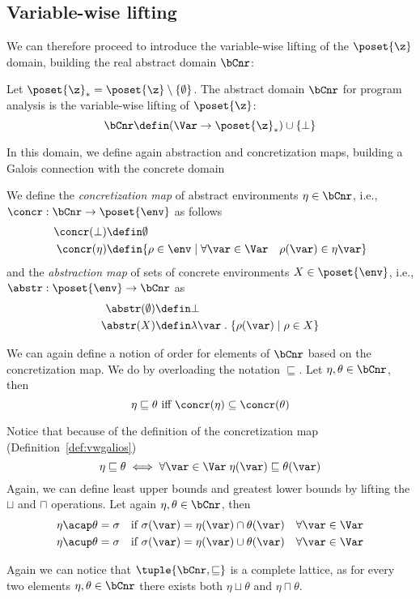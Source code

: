 \subsection{Variable-wise lifting}
\label{sub:vwintervals}

We can therefore proceed to introduce the variable-wise lifting of the
\(\poset{\z}\) domain, building the real abstract domain \(\bCnr\):

\begin{definition}
  Let \(\poset{\z}_* = \poset{\z} \setminus \{\emptyset\}\). The
  abstract domain \(\bCnr\) for program analysis is the variable-wise
  lifting of \(\poset{\z}\):
  \[ \bCnr \defin (\Var \to \poset{\z}_*) \cup \{ \bot \} \]
\end{definition}

In this domain, we define again abstraction and concretization maps,
building a Galois connection with the concrete domain

\begin{definition}
  \label{def:vwgalios}
  We define the \emph{concretization map} of abstract environments
  \(\eta \in \bCnr\), i.e., \({\concr : \bCnr \to \poset{\env}}\) as
  follows
  \begin{align*}
    \concr(\bot) & \defin \emptyset \\
    \concr(\eta) & \defin \{\rho \in \env \mid \forall \var \in \Var \quad \rho(\var) \in \eta\var\}
  \end{align*}
  and the \emph{abstraction map} of sets of concrete environments
  \(X \in \poset{\env}\), i.e., \(\abstr : \poset{\env} \to \bCnr\) as
  \begin{align*}
    \abstr(\emptyset) & \defin \bot \\
    \abstr(X) & \defin \lambda \var \; . \; \{\rho(\var) \mid \rho \in X\}
  \end{align*}
\end{definition}

We can again define a notion of order for elements of \(\bCnr\) based
on the concretization map. We do by overloading the notation
\(\sqsubseteq\). Let \(\eta, \theta \in \bCnr\), then
\begin{equation*}
  \eta \sqsubseteq \theta \text{ iff } \concr(\eta) \subseteq \concr(\theta)
\end{equation*}

Notice that because of the definition of the concretization map
(Definition~\ref{def:vwgalios})
\begin{equation*}
  \eta \sqsubseteq \theta \iff \forall \var \in \Var \; \eta(\var) \sqsubseteq \theta(\var)
\end{equation*}
Again, we can define least upper bounds and greatest lower bounds by
lifting the \(\sqcup\) and \(\sqcap\) operations. Let again
\(\eta, \theta \in \bCnr\), then
\begin{align*}
  \eta \acap \theta = \sigma & \quad \text{if } \sigma(\var) = \eta(\var) \cap \theta(\var) \quad \forall \var\in\Var \\
  \eta \acup \theta = \sigma & \quad \text{if } \sigma(\var) = \eta(\var) \cup \theta(\var) \quad \forall \var\in\Var
\end{align*}

Again we can notice that \(\tuple{\bCnr, \sqsubseteq}\) is a complete
lattice, as for every two elements \(\eta,\theta\in\bCnr\) there
exists both \(\eta \sqcup \theta\) and \(\eta \sqcap \theta\).
